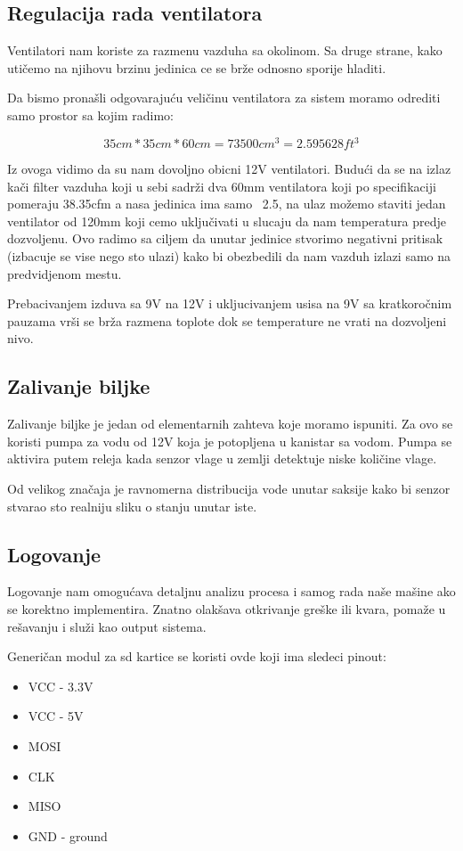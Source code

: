 \documentclass[a4paper,11pt]{book}
\begin{document}
\subsection{Regulacija rada ventilatora}
Ventilatori nam koriste za razmenu vazduha sa okolinom. Sa druge strane, kako utičemo na njihovu brzinu jedinica ce se brže odnosno sporije hladiti.

Da bismo pronašli odgovarajuću veličinu ventilatora za sistem moramo odrediti samo prostor sa kojim radimo:

\[ 35cm * 35cm * 60cm =  73500cm^3 = 2.595628ft^3\]

Iz ovoga vidimo da su nam dovoljno obicni 12V ventilatori. Budući da se na izlaz kači filter vazduha koji u sebi sadrži dva 60mm ventilatora koji po specifikaciji pomeraju 38.35cfm a nasa jedinica ima samo ~2.5, na ulaz možemo staviti jedan ventilator od 120mm koji cemo uključivati u slucaju da nam temperatura predje dozvoljenu. Ovo radimo sa ciljem da unutar jedinice stvorimo negativni pritisak (izbacuje se vise nego sto ulazi) kako bi obezbedili da nam vazduh izlazi samo na predvidjenom mestu.

\noindent Prebacivanjem izduva sa 9V na 12V i ukljucivanjem usisa na 9V sa kratkoročnim pauzama vrši se brža razmena toplote dok se temperature ne vrati na dozvoljeni nivo. 

\subsection{Zalivanje biljke}
Zalivanje biljke je jedan od elementarnih zahteva koje moramo ispuniti. Za ovo se koristi pumpa za vodu od 12V koja je potopljena u kanistar sa vodom. Pumpa se aktivira putem releja kada senzor vlage u zemlji detektuje niske količine vlage.

\noindent Od velikog značaja je ravnomerna distribucija vode unutar saksije kako bi senzor stvarao sto realniju sliku o stanju unutar iste.

\subsection{Logovanje}
Logovanje nam omogućava detaljnu analizu procesa i samog rada naše mašine ako se korektno implementira. Znatno olakšava otkrivanje greške ili kvara, pomaže u rešavanju i služi kao output sistema.

Generičan modul za sd kartice se koristi ovde koji ima sledeci pinout:

\hrulefill
\begin{itemize}
  \item VCC - 3.3V
  \item VCC - 5V
  \item MOSI
  \item CLK 
  \item MISO
  \item GND - ground
\end{itemize}
\hrulefill
\end{document}
